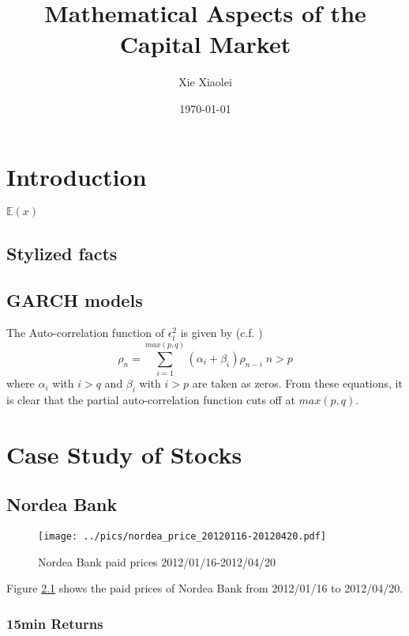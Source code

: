 \documentclass{book}
\title{Mathematical Aspects of the Capital Market}
\author{Xie Xiaolei}
\date{\today}
\begin{document}
\maketitle
\tableofcontents

\chapter{Introduction}
$\mathbb{E}(x)$

\section{Stylized facts}

\section{GARCH models}
The Auto-correlation function of $\epsilon_t^2$ is given by (c.f. \cite{Bollerslev87})
$$
\rho_n = \sum_{i=1}^{max(p,q)} (\alpha_i + \beta_i) \rho_{n-i}
\;n > p
$$
where $\alpha_i$ with $i > q$ and $\beta_i$ with $i > p$ are taken as
zeros. From these equations, it is clear that the partial
auto-correlation function cuts off at $max(p, q)$.


\chapter{Case Study of Stocks}
\section{Nordea Bank}
\begin{figure}[ht]
  \centering
  \texttt{[image: ../pics/nordea\_price\_20120116-20120420.pdf]}
  \caption{Nordea Bank paid prices 2012/01/16-2012/04/20}
  \label{fig:Nordea}
\end{figure}
Figure \ref{fig:Nordea} shows the paid prices of Nordea Bank from
2012/01/16 to 2012/04/20.

\subsection{15min Returns}
\end{document}
